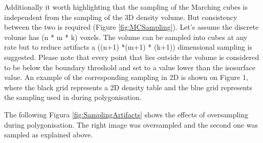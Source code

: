 \documentclass{subfiles}
\begin{document}
\par Additionally it worth highlighting that the sampling of the Marching cubes is independent from the sampling of the 3D density volume. But consistency between the two is required (Figure \ref{fig:MCSampling}). Let’s assume the discrete volume has (n * m * k) voxels. The volume can be sampled into cubes at any rate but to reduce artifacts a ((n+1) *(m+1) * (k+1)) dimensional sampling is suggested. Please note that every point that lies outside the volume is considered to be below the boundary threshold and set to a value lower than the isosurface value. An example of the corresponding sampling in 2D is shown on Figure 1, where the black grid represents a 2D density table and the blue grid represents the sampling used in during polygonisation.

\par The following Figura \ref{fig:SamplingArtifacts} shows the effects of oversampling during polygonisation. The right image was oversampled and the second one was sampled as explained above.
\end{document}
